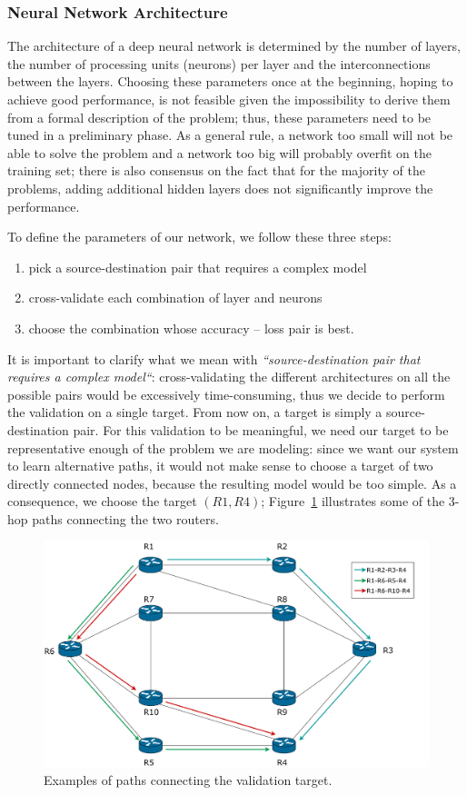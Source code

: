 \subsubsection{Neural Network Architecture}
The architecture of a deep neural network is determined by the number of layers, the number of processing units (neurons) per layer and the interconnections between the layers. Choosing these parameters once at the beginning, hoping to achieve good performance, is not feasible given the impossibility to derive them from a formal description of the problem; thus, these parameters need to be tuned in a preliminary phase. As a general rule, a network too small will not be able to solve the problem and a network too big will probably overfit on the training set; there is also consensus on the fact that for the majority of the problems, adding additional hidden layers does not significantly improve the performance.

To define the parameters of our network, we follow these three steps:
\begin{enumerate}
\item pick a source-destination pair that requires a complex model
\item cross-validate each combination of layer and neurons
\item choose the combination whose accuracy -- loss pair is best.
\end{enumerate}

It is important to clarify what we mean with \textit{``source-destination pair that requires a complex model``}: cross-validating the different architectures on all the possible pairs would be excessively time-consuming, thus we decide to perform the validation on a single target. From now on, a target is simply a source-destination pair. For this validation to be meaningful, we need our target to be representative enough of the problem we are modeling: since we want our system to learn alternative paths, it would not make sense to choose a target of two directly connected nodes, because the resulting model would be too simple. As a consequence, we choose the target $(R1, R4)$; Figure~\ref{fig:validation_target} illustrates some of the 3-hop paths connecting the two routers.

\begin{figure}
\centering
\includegraphics[width=\textwidth]{img/validation_target}
\caption{Examples of paths connecting the validation target.}
\label{fig:validation_target}
\end{figure}


